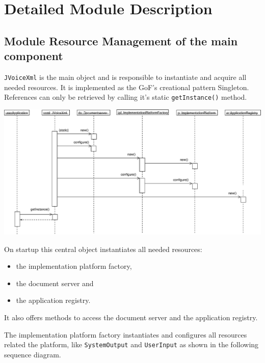\documentclass[11pt,a4paper]{article}
\begin{document}
\section{Detailed Module Description}
\label{sec:deta-module-descr}

\subsection{Module Resource Management of the main component}

\texttt{JVoiceXml} is the main object and is responsible to instantiate and
acquire all needed resources. It is implemented as the GoF's creational
pattern Singleton\cite{gamma:design_patterns}. References
can only be retrieved by calling it's static \texttt{getInstance()} method.

\begin{center}
\includegraphics[scale=0.4]{seq-jvoicexml-startup.eps}
\end{center}

On startup this central object instantiates all needed resources:

\begin{itemize}
\item the implementation platform factory,
\item the document server and
\item the application registry.
\end{itemize}

It also offers methods to access the document server and the application
registry.

The implementation platform factory instantiates and configures all
resources related the platform, like \texttt{SystemOutput} and
\texttt{UserInput} as shown in the following sequence diagram.
\end{document}
